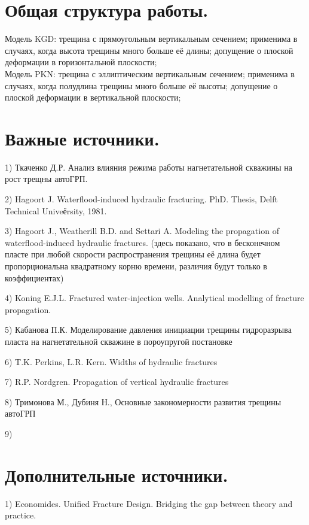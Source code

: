 \documentclass[a4paper, 11pt]{article}
\begin{document}
\section{Общая структура работы.}

Модель KGD: трещина с прямоугольным вертикальным сечением; применима в случаях, когда высота трещины много больше её длины; допущение о плоской деформации в горизонтальной плоскости;
\\

Модель PKN: трещина с эллиптическим вертикальным сечением; применима в случаях, когда полудлина трещины много больше её высоты; допущение о плоской деформации в вертикальной плоскости;
\\

\section{Важные источники.}

1) Ткаченко Д.Р. Анализ влияния режима работы нагнетательной скважины на рост трещны автоГРП.

2) Hagoort J. Waterflood-induced hydraulic fracturing. PhD. Thesis, Delft Technical Univeёrsity, 1981.

3) Hagoort J., Weatherill B.D. and Settari A. Modeling the propagation of waterflood-induced hydraulic fractures. (здесь показано, что в бесконечном пласте при любой скорости распространения трещины её длина будет пропорциональна квадратному корню времени, различия будут только в коэффициентах)

4) Koning E.J.L. Fractured water-injection wells. Analytical modelling of fracture propagation.

5) Кабанова П.К. Моделирование давления инициации трещины гидроразрыва пласта на нагнетательной скважине в пороупругой постановке

6) T.K. Perkins, L.R. Kern. Widths of hydraulic fractures

7) R.P. Nordgren. Propagation of vertical hydraulic fractures

8) Тримонова М., Дубиня Н., Основные закономерности развития трещины автоГРП

9) 
\\

\section{Дополнительные источники.}

1) Economides. Unified Fracture Design. Bridging the gap between theory and practice.
\end{document}
